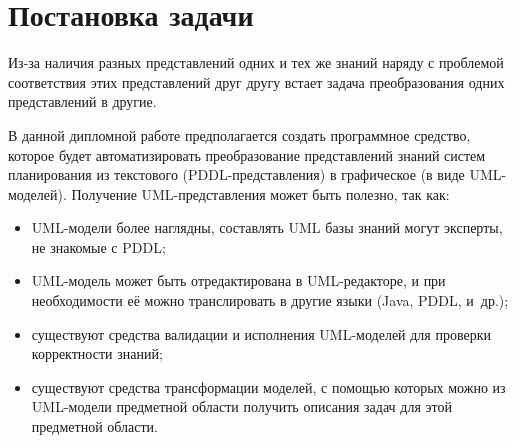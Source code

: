 \documentclass[a4paper,14pt]{extreport}
\begin{document}
   
    
\section*{Постановка задачи}

     Из-за наличия разных представлений одних и тех же знаний наряду с проблемой соответствия этих представлений друг другу встает задача преобразования одних представлений в другие.
 
    В данной дипломной работе предполагается создать программное средство, которое будет автоматизировать преобразование представлений знаний систем планирования из текстового (PDDL-представления) в графическое (в виде UML-моделей).
 Получение UML-представления может быть полезно, так как:
    \begin{itemize}
        \item UML-модели более наглядны, составлять UML базы знаний могут эксперты, не знакомые с PDDL;
        \item UML-модель может быть отредактирована в UML-редакторе, и при необходимости её можно транслировать в другие языки (Java, PDDL, и~др.);
        \item существуют средства валидации и исполнения UML-моделей для проверки корректности знаний\cite{use}; 
        \item существуют средства трансформации моделей, с помощью которых можно из UML-модели предметной области получить описания задач для этой предметной области.
    \end{itemize}
\end{document}
